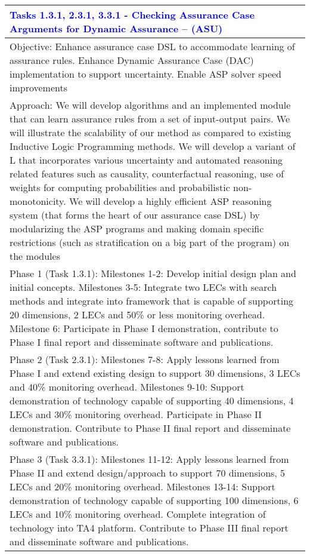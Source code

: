 {\begin{longtable} {|p{\textwidth} | }
\textcolor{blue} {\footnotesize {\textbf{Tasks 1.3.1, 2.3.1, 3.3.1 - Checking Assurance Case Arguments for Dynamic Assurance – (ASU)}} }\\ \hline
Objective: Enhance assurance case DSL to accommodate learning of assurance rules.    Enhance Dynamic Assurance Case (DAC) implementation to support uncertainty.   Enable ASP solver speed improvements 
 \\ \hline
Approach: We will develop algorithms and an implemented module that can learn assurance rules from a set of input-output pairs. We will illustrate the scalability of our method as compared to existing Inductive Logic Programming methods.  We will develop a variant of L that incorporates various uncertainty and automated reasoning related features such as causality, counterfactual reasoning, use of weights for computing probabilities and probabilistic non-monotonicity.  We will develop a highly efficient ASP reasoning system (that forms the heart of our assurance case DSL) by modularizing the ASP programs and making domain specific restrictions (such as stratification on a big part of the program) on the modules \\ \hline
Phase 1 (Task 1.3.1): Milestones 1-2:  Develop initial design plan and initial concepts.  Milestones 3-5:  Integrate two LECs with search methods and integrate into framework that is capable of supporting 20 dimensions, 2 LECs and 50\% or less monitoring overhead.   Milestone 6: Participate in Phase I demonstration, contribute to Phase I final report and disseminate software and publications. \\ \hline
Phase 2 (Task 2.3.1): Milestones 7-8:  Apply lessons learned from Phase I and extend existing design to support 30 dimensions, 3 LECs and 40\% monitoring overhead.  Milestones 9-10:  Support demonstration of technology capable of supporting 40 dimensions, 4 LECs and 30\% monitoring overhead.  Participate in Phase II demonstration.  Contribute to Phase II final report and disseminate software and publications. \\ \hline
Phase 3 (Task 3.3.1): Milestones 11-12:  Apply lessons learned from Phase II and extend design/approach to support 70 dimensions, 5 LECs and 20\% monitoring overhead.  Milestones 13-14:  Support demonstration of technology capable of supporting 100 dimensions, 6 LECs and 10\% monitoring overhead.  Complete integration of technology into TA4 platform.  Contribute to Phase III final report and disseminate software and publications. \\ \hline

\end{longtable}}
